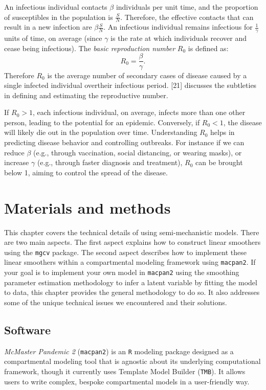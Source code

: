 \documentclass[
11pt, %
oneside, %
english, %
singlespacing, %
]{macthesis} %
\begin{document}
An infectious individual contacts \(\beta\) individuals per unit time, and the proportion of susceptibles in the population is \(\frac{S}{N}\). Therefore, the effective contacts that can result in a new infection are \(\beta \frac{S}{N}\). An infectious individual remains infectious for \(\frac{1}{\gamma}\) units of time, on average (since \(\gamma\) is the rate at which individuals recover and cease being infectious). The \emph{basic reproduction number} \(R_0\) is defined as:
\[
   R_0 = \frac{\beta}{\gamma}.
   \]
Therefore \(R_0\) is the average number of secondary cases of disease caused by a single infected individual overtheir infectious period. {[}21{]} discusses the subtleties in defining and estimating the reproductive number.

If \(R_0 > 1\), each infectious individual, on average, infects more than one other person, leading to the potential for an epidemic. Conversely, if \(R_0 < 1\), the disease will likely die out in the population over time. Understanding \(R_0\) helps in predicting disease behavior and controlling outbreaks. For instance if we can reduce \(\beta\) (e.g., through vaccination, social distancing, or wearing masks), or increase \(\gamma\) (e.g., through faster diagnosis and treatment), \(R_0\) can be brought below 1, aiming to control the spread of the disease.

\chapter{Materials and methods}\label{Materials-and-methods}

This chapter covers the technical details of using semi-mechanistic models. There are two main aspects. The first aspect explains how to construct linear smoothers using the \texttt{mgcv} package. The second aspect describes how to implement these linear smoothers within a compartmental modeling framework using \texttt{macpan2}. If your goal is to implement your own model in \texttt{macpan2} using the smoothing parameter estimation methodology to infer a latent variable by fitting the model to data, this chapter provides the general methodology to do so. It also addresses some of the unique technical issues we encountered and their solutions.

\section{Software}\label{Software}

\emph{McMaster Pandemic 2} (\texttt{macpan2}) is an \texttt{R} modeling package designed as a compartmental modeling tool that is agnostic about its underlying computational framework, though it currently uses Template Model Builder (\texttt{TMB}). It allows users to write complex, bespoke compartmental models in a user-friendly way.
\end{document}
